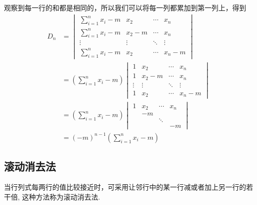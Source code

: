 \begin{solution}
    观察到每一行的和都是相同的，所以我们可以将每一列都累加到第一列上，得到
    \begin{align*}
        D_n & =\begin{vmatrix}
                   \displaystyle\sum_{i=1}^{n} x_i-m & x_2    & \cdots & x_n    \\
                   \displaystyle\sum_{i=1}^{n} x_i-m & x_2-m  & \cdots & x_n    \\
                   \vdots                            & \vdots & \ddots & \vdots \\
                   \displaystyle\sum_{i=1}^{n} x_i-m & x_2    & \cdots & x_n-m
               \end{vmatrix} \\
            & =\left(\sum_{i=1}^{n} x_i-m\right)
        \begin{vmatrix}
            1      & x_2    & \cdots & x_n    \\
            1      & x_2-m  & \cdots & x_n    \\
            \vdots & \vdots & \ddots & \vdots \\
            1      & x_2    & \cdots & x_n-m
        \end{vmatrix}                                   \\
            & =\left(\sum_{i=1}^{n} x_i-m\right)
        \begin{vmatrix}
            1 & x_2 & \cdots & x_n \\
              & -m  &        &     \\
              &     & \ddots &     \\
              &     &        & -m
        \end{vmatrix}                                              \\
            & =(-m)^{n-1}\left(\sum_{i=1}^{n} x_i-m\right)
    \end{align*}
\end{solution}

\subsection{滚动消去法}

当行列式每两行的值比较接近时，可采用让邻行中的某一行减或者加上另一行的若干倍, 这种方法称为滚动消去法.


